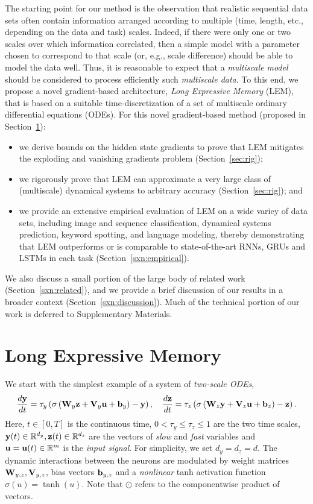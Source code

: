\documentclass{article} \usepackage{iclr2022_conference,times}
\newcommand{\by}{{\bf y}}
\newcommand{\bz}{{\bf z}}
\newcommand{\bW}{{\bf W}}
\newcommand{\bu}{{\bf u}}
\newcommand{\bb}{{\bf b}}
\newcommand{\bV}{{\bf V}}
\newcommand{\R}{{\mathbb R}}
\begin{document}
The starting point for our method is the observation that realistic sequential data sets often contain information arranged according to multiple (time, length, etc., depending on the data and task) scales. 
Indeed, if there were only one or two scales over which information correlated, then a simple model with a parameter chosen to correspond to that scale (or, e.g., scale difference) should be able to model the data well.
Thus, it is reasonable to expect that a \emph{multiscale model} should be considered to process efficiently such \emph{multiscale data}. 
To this end, we propose a novel gradient-based architecture, \emph{Long Expressive Memory} (LEM), that is based on a suitable time-discretization of a set of multiscale ordinary differential equations (ODEs). 
For this novel gradient-based method (proposed in Section~\ref{sxn:lem}): 
\begin{itemize}
    \item 
    we derive bounds on the hidden state gradients to prove that LEM mitigates the exploding and vanishing gradients problem (Section~\ref{sec:rig});
    \item 
    we rigorously prove that LEM can approximate a very large class of (multiscale) dynamical systems to arbitrary accuracy (Section~\ref{sec:rig}); and
    \item 
    we provide an extensive empirical evaluation of LEM on a wide variey of data sets, including image and sequence classification, dynamical systems prediction, keyword spotting, and language modeling, thereby demonstrating that LEM outperforms or is comparable to state-of-the-art RNNs, GRUs and LSTMs in each task (Section~\ref{sxn:empirical}).  
\end{itemize}
We also discuss a small portion of the large body of related work (Section~\ref{sxn:related}), and we provide a brief discussion of our results in a broader context (Section~\ref{sxn:discussion}). 
Much of the technical portion of our work is deferred to Supplementary Materials.


\section{Long Expressive Memory}
\label{sxn:lem}

We start with the simplest example of a system of \emph{two-scale ODEs},
\begin{equation}
	\label{eq:ode2}
	\frac{d\by}{dt} = \tau_y \left(\sigma\left(\bW_y \bz + \bV_y \bu + \bb_y\right) - \by\right), \quad
	\frac{d\bz}{dt} = \tau_z \left(\sigma\left(\bW_z \by + \bV_z \bu + \bb_z\right) - \bz\right).
\end{equation}
Here, $t \in [0,T]$ is the continuous time, $0 < \tau_y \leq \tau_z \leq 1$ are the two time scales, $\by(t) \in \R^{d_y},\bz(t)\in \R^{d_z}$ are the vectors of \emph{slow} and \emph{fast} variables and $\bu = \bu(t) \in \R^m$ is the \emph{input signal}. For simplicity, we set $d_y=d_z = d$. The dynamic interactions between the neurons are modulated by weight matrices $\bW_{y,z},\bV_{y,z}$, bias vectors $\bb_{y,z}$ and a \emph{nonlinear} tanh activation function $\sigma(u) = \tanh(u)$. Note that $\odot$ refers to the componentwise product of vectors.
\end{document}

